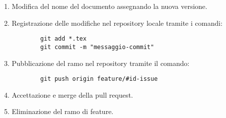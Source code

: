 \documentclass[a4paper, 12pt]{article}
\def\ultima-versione{ ULTIMA VERSIONE }
\begin{document}
\begin{enumerate}
    Il cambiamento della versione richiede i seguenti passi:
    \begin{itemize}
        \item Modifica della variabile \LaTeX \space chiamata \lstinline|\ultima-versione| seguendo la convenzione descritta nella sezione \hyperref[subsec:vers]{Versionamento}.
        Questa variabile deve essere usata nella colonna Versione del registro delle modifiche.

        \underline{Occhio alla "v" che precede la versione.}

        \item Modifica del valore della colonna Versione nella riga precedente assegnando la versione indicata nel nome del documento sorgente. 
    \end{itemize}

    \item Modifica del nome del documento assegnando la nuova versione.
    
    \item Registrazione delle modifiche nel repository locale tramite i comandi:
    \begin{lstlisting}
        git add *.tex
        git commit -m "messaggio-commit"
    \end{lstlisting}

    \item Pubblicazione del ramo nel repository tramite il comando:
    \begin{lstlisting}
        git push origin feature/#id-issue
    \end{lstlisting}

    \item Accettazione e merge della pull request.
    
    \item Eliminazione del ramo di feature.
\end{enumerate}
\end{document}
